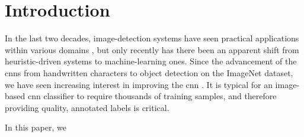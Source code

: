 \section{Introduction}

In the last two decades, image-detection systems have seen practical applications within various domains \citep{Tsai:2010cn,Girod:2011gw,Takacs:2008cg,Sivic:2003tj,Lowe:2004kp,Bay:2008ud,Jin:2016jd,Smeulders:2000tx}, but only recently has there been an apparent shift from heuristic-driven systems to machine-learning ones. Since the advancement of the \glspl{cnn} from handwritten characters \citep{Lecun:1998hy} to object detection \citep{Krizhevsky:2012wl} on the ImageNet dataset, we have seen increasing interest in improving the \gls{cnn} \cite{Girshick:2014jx,Girshick:2015vr,Ren:2017ug,He:2017ud}. It is typical for an image-based \gls{cnn} classifier to require thousands of training samples, and therefore providing quality, annotated labels is critical.

In this paper, we 